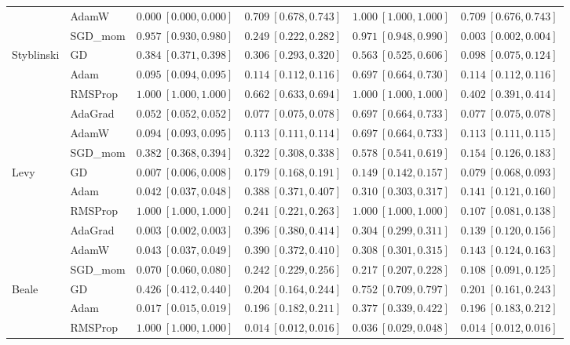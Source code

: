 \documentclass[11pt]{article}
\begin{document}
{\begin{longtable}{llcccc}
 & AdamW & $0.000\ [0.000,0.000]$ & $0.709\ [0.678,0.743]$ & $1.000\ [1.000,1.000]$ & $0.709\ [0.676,0.743]$ \\
 & SGD\_mom & $0.957\ [0.930,0.980]$ & $0.249\ [0.222,0.282]$ & $0.971\ [0.948,0.990]$ & $0.003\ [0.002,0.004]$ \\
Styblinski & GD & $0.384\ [0.371,0.398]$ & $0.306\ [0.293,0.320]$ & $0.563\ [0.525,0.606]$ & $0.098\ [0.075,0.124]$ \\
 & Adam & $0.095\ [0.094,0.095]$ & $0.114\ [0.112,0.116]$ & $0.697\ [0.664,0.730]$ & $0.114\ [0.112,0.116]$ \\
 & RMSProp & $1.000\ [1.000,1.000]$ & $0.662\ [0.633,0.694]$ & $1.000\ [1.000,1.000]$ & $0.402\ [0.391,0.414]$ \\
 & AdaGrad & $0.052\ [0.052,0.052]$ & $0.077\ [0.075,0.078]$ & $0.697\ [0.664,0.733]$ & $0.077\ [0.075,0.078]$ \\
 & AdamW & $0.094\ [0.093,0.095]$ & $0.113\ [0.111,0.114]$ & $0.697\ [0.664,0.733]$ & $0.113\ [0.111,0.115]$ \\
 & SGD\_mom & $0.382\ [0.368,0.394]$ & $0.322\ [0.308,0.338]$ & $0.578\ [0.541,0.619]$ & $0.154\ [0.126,0.183]$ \\
Levy & GD & $0.007\ [0.006,0.008]$ & $0.179\ [0.168,0.191]$ & $0.149\ [0.142,0.157]$ & $0.079\ [0.068,0.093]$ \\
 & Adam & $0.042\ [0.037,0.048]$ & $0.388\ [0.371,0.407]$ & $0.310\ [0.303,0.317]$ & $0.141\ [0.121,0.160]$ \\
 & RMSProp & $1.000\ [1.000,1.000]$ & $0.241\ [0.221,0.263]$ & $1.000\ [1.000,1.000]$ & $0.107\ [0.081,0.138]$ \\
 & AdaGrad & $0.003\ [0.002,0.003]$ & $0.396\ [0.380,0.414]$ & $0.304\ [0.299,0.311]$ & $0.139\ [0.120,0.156]$ \\
 & AdamW & $0.043\ [0.037,0.049]$ & $0.390\ [0.372,0.410]$ & $0.308\ [0.301,0.315]$ & $0.143\ [0.124,0.163]$ \\
 & SGD\_mom & $0.070\ [0.060,0.080]$ & $0.242\ [0.229,0.256]$ & $0.217\ [0.207,0.228]$ & $0.108\ [0.091,0.125]$ \\
Beale & GD & $0.426\ [0.412,0.440]$ & $0.204\ [0.164,0.244]$ & $0.752\ [0.709,0.797]$ & $0.201\ [0.161,0.243]$ \\
 & Adam & $0.017\ [0.015,0.019]$ & $0.196\ [0.182,0.211]$ & $0.377\ [0.339,0.422]$ & $0.196\ [0.183,0.212]$ \\
 & RMSProp & $1.000\ [1.000,1.000]$ & $0.014\ [0.012,0.016]$ & $0.036\ [0.029,0.048]$ & $0.014\ [0.012,0.016]$ \\

\end{longtable}}
\end{document}
